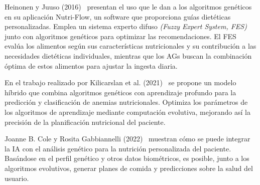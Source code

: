 Heinonen y Juuso (2016)~\cite{heinonen2016} presentan el uso que le dan a los algoritmos genéticos en su aplicación Nutri-Flow, un software que proporciona guías dietéticas personalizadas. Emplea un sistema experto difuso \textit{(Fuzzy Expert System, FES)} junto con algoritmos genéticos para optimizar las recomendaciones. El FES evalúa los alimentos según sus características nutricionales y su contribución a las necesidades dietéticas individuales, mientras que los AGs buscan la combinación óptima de estos alimentos para ajustar la ingesta diaria.

En el trabajo realizado por Kilicarslan et al. (2021)~\cite{kilicarslan2021} se propone un modelo híbrido que combina algoritmos genéticos con aprendizaje profundo para la predicción y clasificación de anemias nutricionales. Optimiza los parámetros de los algoritmos de aprendizaje mediante computación evolutiva, mejorando así la precisión de la planificación nutricional del paciente.

Joanne B. Cole y Rosita Gabbiannelli (2022)~\cite{cole2022} muestran cómo se puede integrar la IA con el análisis genético para la nutrición personalizada del paciente. Basándose en el perfil genético y otros datos biométricos, es posible, junto a los algoritmos evolutivos, generar planes de comida y predicciones sobre la salud del usuario.